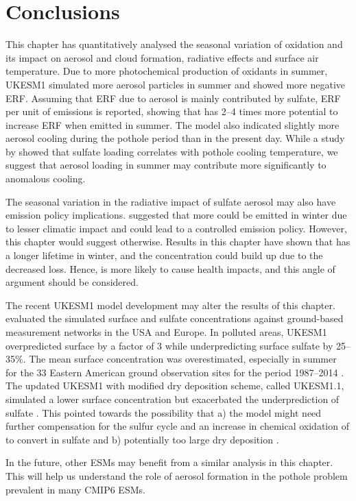\section{Conclusions}


This chapter has quantitatively analysed the seasonal variation of  oxidation and its impact on aerosol and cloud formation, radiative effects and surface air temperature. Due to more photochemical production of oxidants in summer, UKESM1 simulated more aerosol particles in summer and showed more negative ERF. Assuming that ERF due to aerosol is mainly contributed by sulfate, ERF per unit of  emissions is reported, showing that  has 2--4 times more potential to increase ERF when emitted in summer. The model also indicated slightly more aerosol cooling during the pothole period than in the present day. While a study by \citet{zhangRoleAnthropogenicAerosols2021} showed that sulfate loading correlates with pothole cooling temperature, we suggest that aerosol loading in summer may contribute more significantly to anomalous cooling. 


The seasonal variation in the radiative impact of sulfate aerosol may also have emission policy implications. \citet{bellouinRegionalSeasonalRadiative2016} suggested that more  could be emitted in winter due to lesser climatic impact and could lead to a controlled emission policy. However, this chapter would suggest otherwise. Results in this chapter have shown that  has a longer lifetime in winter, and the concentration could build up due to the decreased loss. Hence,  is more likely to cause health impacts, and this angle of argument should be considered.


The recent UKESM1 model development may alter the results of this chapter. \citet{hardacreEvaluationSO2SO422021} evaluated the simulated surface  and sulfate concentrations against ground-based measurement networks in the USA and Europe. In polluted areas, UKESM1 overpredicted surface  by a factor of 3 while underpredicting surface sulfate by 25--35\%. The mean surface  concentration was overestimated, especially in summer for the 33 Eastern American ground observation sites for the period 1987--2014 \citep{hardacreEvaluationSO2SO422021}. The updated UKESM1 with modified  dry deposition scheme, called UKESM1.1, simulated a lower surface  concentration but exacerbated the underprediction of sulfate \citep{mulcahyUKESM11DevelopmentEvaluation2023}. This pointed towards the possibility that a) the model might need further compensation for the sulfur cycle and an increase in chemical oxidation of  to convert  in sulfate and b) potentially too large dry deposition \citep{mulcahyUKESM11DevelopmentEvaluation2023}.


In the future, other ESMs may benefit from a similar analysis in this chapter. This will help us understand the role of aerosol formation in the pothole problem prevalent in many CMIP6 ESMs. 

